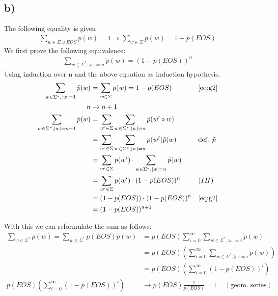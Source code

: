 \documentclass[a4paper,12pt]{ETHexercise}
\begin{document}
\subsection*{b)}
The following equality is given
\begin{align}
    \sum_{w \in \Sigma \cup EOS} p(w) = 1 \Rightarrow \sum_{w \in \Sigma} p(w) = 1 - p(EOS) \label{eq:g2}
\end{align}
We first prove the following equivalence:
\begin{align}
    \sum_{w \in \Sigma^*, |w| = n} \tilde{p}(w) = (1 - p(EOS))^n
\end{align}
Using induction over n and the above equation as induction hypothesis.
\begin{align}
    \sum_{w \in \Sigma^*, |w| = 1} \tilde{p}(w) &= \sum_{w \in \Sigma} p(w) = 1 - p(EOS) &&\ref{eq:g2} \\
    n &\rightarrow n+1 \nonumber\\
    \sum_{w \in \Sigma^*, |w| = n+1} \tilde{p}(w) &=  \sum_{w' \in \Sigma}\sum_{w \in \Sigma^*, |w| = n} \tilde{p}(w' \circ w)\\
    &= \sum_{w' \in \Sigma}\sum_{w \in \Sigma^*, |w| = n} p(w')\tilde{p}(w) &&\text{def. }\tilde{p}\\
    &= \sum_{w' \in \Sigma}  p(w') \cdot \sum_{w \in \Sigma^*, |w| = n}\tilde{p}(w)\\
    &= \sum_{w' \in \Sigma}  p(w') \cdot (1-p(EOS))^n &&(IH)\\
    &=  (1-p(EOS)) \cdot (1-p(EOS))^n &&\ref{eq:g2}\\
    &= (1-p(EOS))^{n+1}
\end{align}

With this we can reformulate the sum as follows:
\begin{align}
    \sum_{w \in \Sigma^*} p(w) = \sum_{w \in \Sigma^*} p(EOS) \tilde{p}(w)  &= p(EOS) \sum_{i=0}^{\infty} \sum_{w \in \Sigma^*, |w| = i} \tilde{p}(w)\\
    &= p(EOS)  \left(\sum_{i=0}^{\infty} \sum_{w \in \Sigma^*, |w| = i} \tilde{p}(w)\right)\\
    &= p(EOS)  \left(\sum_{i=0}^{\infty} (1-p(EOS))^{i} \right)\\
     p(EOS) \left(  \sum_{i=0}^{\infty} (1-p(EOS))^{i} \right) &\rightarrow p(EOS)  \frac{1}{p(EOS)} = 1 \quad (\text{geom. series})
\end{align}
\end{document}
